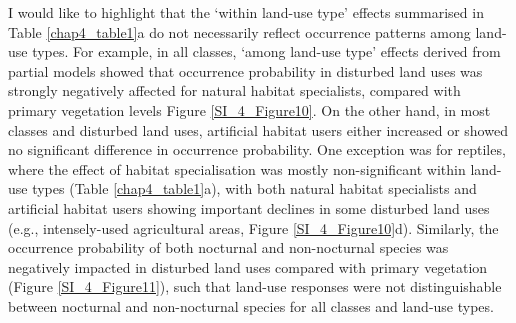 I would like to highlight that the `within land-use type' effects summarised in Table \ref{chap4_table1}a do not necessarily reflect occurrence patterns among land-use types. For example, in all classes, `among land-use type' effects derived from partial models showed that occurrence probability in disturbed land uses was strongly negatively affected for natural habitat specialists, compared with primary vegetation levels Figure \ref{SI_4_Figure10}. On the other hand, in most classes and disturbed land uses, artificial habitat users either increased or showed no significant difference in occurrence probability. One exception was for reptiles, where the effect of habitat specialisation was mostly non-significant within land-use types (Table \ref{chap4_table1}a), with both natural habitat specialists and artificial habitat users showing important declines in some disturbed land uses (e.g., intensely-used agricultural areas, Figure \ref{SI_4_Figure10}d). Similarly, the occurrence probability of both nocturnal and non-nocturnal species was negatively impacted in disturbed land uses compared with primary vegetation (Figure \ref{SI_4_Figure11}), such that land-use responses were not distinguishable between nocturnal and non-nocturnal species for all classes and land-use types. 


